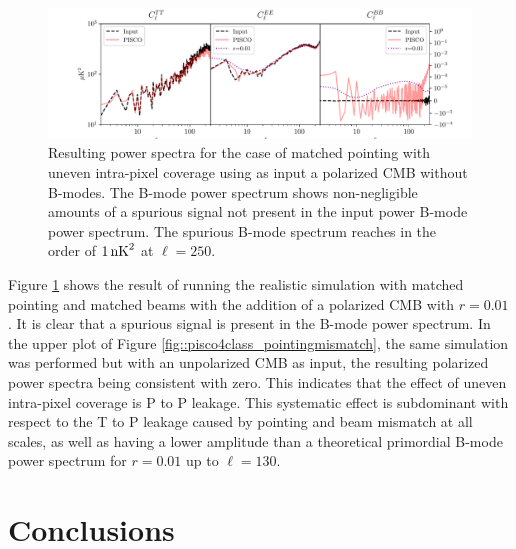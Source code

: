 \documentclass[a4paper,11pt]{article}
\begin{document}
\begin{figure}
	\centering
	\includegraphics[width=1\textwidth]{figures/intrapixel.pdf}
	\caption{Resulting power spectra for the case of matched pointing with uneven intra-pixel coverage using as input a polarized CMB without B-modes. The B-mode power spectrum shows non-negligible amounts of a spurious signal not present in the input power B-mode power spectrum. The spurious B-mode spectrum reaches in the order of $1\, \rm{nK}^2$ at $\ell = 250$.}
	\label{fig::pisco4class_intrapixel}
\end{figure}

Figure \ref{fig::pisco4class_intrapixel} shows the result of running the realistic simulation with matched pointing and matched beams with the addition of a polarized CMB with $r=0.01$. It is clear that a spurious signal is present in the B-mode power spectrum. In the upper plot of Figure \ref{fig::pisco4class_pointingmismatch}, the same simulation was performed but with an unpolarized CMB as input, the resulting polarized power spectra being consistent with zero. This indicates that the effect of uneven intra-pixel coverage is P to P leakage. This systematic effect is subdominant with respect to the T to P leakage caused by pointing and beam mismatch at all scales, as well as having a lower amplitude than a theoretical primordial B-mode power spectrum for $r=0.01$ up to $\ell=130$.

\section{Conclusions}
\label{sec::conclusions}
\end{document}

